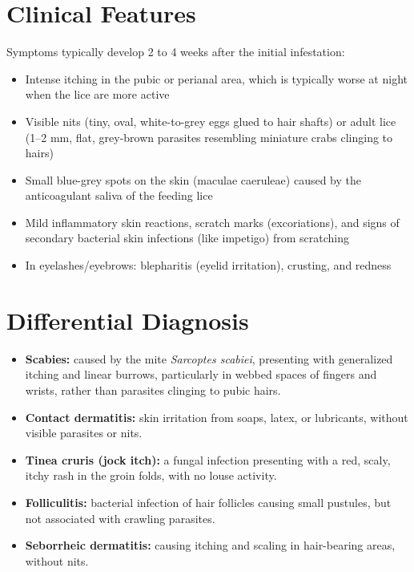 \section*{Clinical Features}
Symptoms typically develop 2 to 4 weeks after the initial infestation:

\begin{itemize}
    \item Intense itching in the pubic or perianal area, which is typically worse at night when the lice are more active
    \item Visible nits (tiny, oval, white-to-grey eggs glued to hair shafts) or adult lice (1--2 mm, flat, grey-brown parasites resembling miniature crabs clinging to hairs)
    \item Small blue-grey spots on the skin (maculae caeruleae) caused by the anticoagulant saliva of the feeding lice
    \item Mild inflammatory skin reactions, scratch marks (excoriations), and signs of secondary bacterial skin infections (like impetigo) from scratching
    \item In eyelashes/eyebrows: blepharitis (eyelid irritation), crusting, and redness
\end{itemize}

\section*{Differential Diagnosis}
\begin{itemize}
    \item \textbf{Scabies:} caused by the mite \textit{Sarcoptes scabiei}, presenting with generalized itching and linear burrows, particularly in webbed spaces of fingers and wrists, rather than parasites clinging to pubic hairs.
    \item \textbf{Contact dermatitis:} skin irritation from soaps, latex, or lubricants, without visible parasites or nits.
    \item \textbf{Tinea cruris (jock itch):} a fungal infection presenting with a red, scaly, itchy rash in the groin folds, with no louse activity.
    \item \textbf{Folliculitis:} bacterial infection of hair follicles causing small pustules, but not associated with crawling parasites.
    \item \textbf{Seborrheic dermatitis:} causing itching and scaling in hair-bearing areas, without nits.
\end{itemize}

